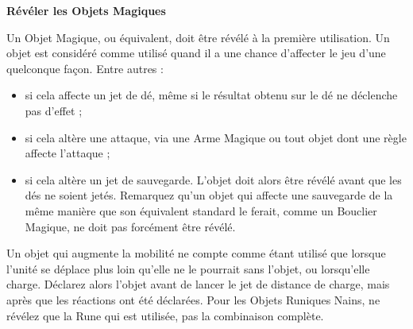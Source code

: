 \noindent\textbf{Révéler les Objets Magiques}

Un Objet Magique, ou équivalent, doit être révélé à la première utilisation. Un objet est considéré comme utilisé quand il a une chance d'affecter le jeu d'une quelconque façon. Entre autres :
\begin{itemize}[label={-}]
\item si cela affecte un jet de dé, même si le résultat obtenu sur le dé ne déclenche pas d'effet ;
\item si cela altère une attaque, via une Arme Magique ou tout objet dont une règle affecte l'attaque ;
\item si cela altère un jet de sauvegarde. L'objet doit alors être révélé avant que les dés ne soient jetés. Remarquez qu'un objet qui affecte une sauvegarde de la même manière que son équivalent standard le ferait, comme un Bouclier Magique, ne doit pas forcément être révélé.
\end{itemize}

Un objet qui augmente la mobilité ne compte comme étant utilisé que lorsque l'unité se déplace plus loin qu'elle ne le pourrait sans l'objet, ou lorsqu'elle charge. Déclarez alors l'objet avant de lancer le jet de distance de charge, mais après que les réactions ont été déclarées. Pour les Objets Runiques Nains, ne révélez que la Rune qui est utilisée, pas la combinaison complète.


